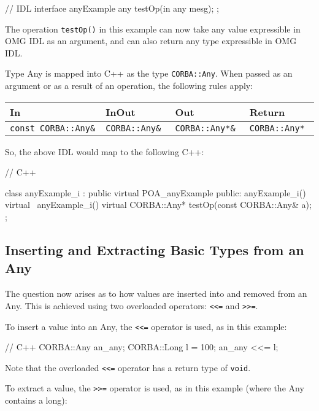 \documentclass[11pt,twoside,a4paper]{book}
\newcommand{\type}[1]{\texttt{#1}}
\newcommand{\code}[1]{\texttt{#1}}
\newcommand{\op}[1]{\texttt{#1()}}
\begin{document}
\begin{idllisting}
// IDL
interface anyExample {
  any testOp(in any mesg);
};
\end{idllisting}


\noindent The operation \op{testOp} in this example can now take any
value expressible in OMG IDL as an argument, and can also return any
type expressible in OMG IDL.

Type Any is mapped into C++ as the type \type{CORBA::Any}. When passed
as an argument or as a result of an operation, the following rules
apply:

\mbox{}

{\small
\begin{tabular}{llll}
{\bf In }                & {\bf InOut }       & {\bf Out }           & 
{\bf Return }                                                   \\ \hline
{\tt const CORBA::Any\& }& {\tt CORBA::Any\& }& {\tt CORBA::Any*\& } & 
{\tt CORBA::Any* }
\end{tabular}
}

\mbox{}

\noindent So, the above IDL would map to the following C++:

\begin{cxxlisting}
// C++

class anyExample_i : public virtual POA_anyExample {
public:
  anyExample_i() { }
  virtual ~anyExample_i() { }
  virtual CORBA::Any* testOp(const CORBA::Any& a);
};
\end{cxxlisting}


\subsection{Inserting and Extracting Basic Types from an Any}

The question now arises as to how values are inserted into and removed
from an Any. This is achieved using two overloaded operators:
\code{<{}<=} and \code{>{}>=}.

To insert a value into an Any, the \code{<{}<=} operator is used, as
in this example:

\begin{cxxlisting}
// C++
CORBA::Any an_any;
CORBA::Long l = 100;
an_any <<= l;
\end{cxxlisting}

\noindent Note that the overloaded \code{<{}<=} operator has a return
type of \type{void}.

To extract a value, the \code{>{}>=} operator is used, as in this
example (where the Any contains a long):
\end{document}
